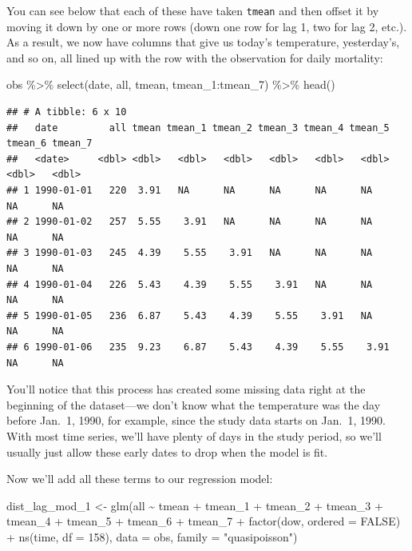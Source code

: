 \documentclass[
]{book}
\newenvironment{Shaded}{\begin{snugshade}}{\end{snugshade}}
\newcommand{\AttributeTok}[1]{\textcolor[rgb]{0.77,0.63,0.00}{#1}}
\newcommand{\ConstantTok}[1]{\textcolor[rgb]{0.00,0.00,0.00}{#1}}
\newcommand{\DecValTok}[1]{\textcolor[rgb]{0.00,0.00,0.81}{#1}}
\newcommand{\FunctionTok}[1]{\textcolor[rgb]{0.00,0.00,0.00}{#1}}
\newcommand{\NormalTok}[1]{#1}
\newcommand{\OtherTok}[1]{\textcolor[rgb]{0.56,0.35,0.01}{#1}}
\newcommand{\SpecialCharTok}[1]{\textcolor[rgb]{0.00,0.00,0.00}{#1}}
\newcommand{\StringTok}[1]{\textcolor[rgb]{0.31,0.60,0.02}{#1}}
\begin{document}
You can see below that each of these have taken \texttt{tmean} and then offset it by moving it down
by one or more rows (down one row for lag 1, two for lag 2, etc.). As a result, we now have
columns that give us today's temperature, yesterday's, and so on, all lined up with the
row with the observation for daily mortality:

\begin{Shaded}
\begin{Highlighting}[]
\NormalTok{obs }\SpecialCharTok{\%\textgreater{}\%} 
  \FunctionTok{select}\NormalTok{(date, all, tmean, tmean\_1}\SpecialCharTok{:}\NormalTok{tmean\_7) }\SpecialCharTok{\%\textgreater{}\%} 
  \FunctionTok{head}\NormalTok{()}
\end{Highlighting}
\end{Shaded}

\begin{verbatim}
## # A tibble: 6 x 10
##   date         all tmean tmean_1 tmean_2 tmean_3 tmean_4 tmean_5 tmean_6 tmean_7
##   <date>     <dbl> <dbl>   <dbl>   <dbl>   <dbl>   <dbl>   <dbl>   <dbl>   <dbl>
## 1 1990-01-01   220  3.91   NA      NA      NA      NA      NA         NA      NA
## 2 1990-01-02   257  5.55    3.91   NA      NA      NA      NA         NA      NA
## 3 1990-01-03   245  4.39    5.55    3.91   NA      NA      NA         NA      NA
## 4 1990-01-04   226  5.43    4.39    5.55    3.91   NA      NA         NA      NA
## 5 1990-01-05   236  6.87    5.43    4.39    5.55    3.91   NA         NA      NA
## 6 1990-01-06   235  9.23    6.87    5.43    4.39    5.55    3.91      NA      NA
\end{verbatim}

You'll notice that this process has created some missing data right at the beginning of the
dataset---we don't know what the temperature was the day before Jan.~1, 1990, for example,
since the study data starts on Jan.~1, 1990. With most time series, we'll have plenty of
days in the study period, so we'll usually just allow these early dates to drop when the
model is fit.

Now we'll add all these terms to our regression model:

\begin{Shaded}
\begin{Highlighting}[]
\NormalTok{dist\_lag\_mod\_1 }\OtherTok{\textless{}{-}} \FunctionTok{glm}\NormalTok{(all }\SpecialCharTok{\textasciitilde{}}\NormalTok{ tmean }\SpecialCharTok{+}\NormalTok{ tmean\_1 }\SpecialCharTok{+}\NormalTok{ tmean\_2 }\SpecialCharTok{+}\NormalTok{ tmean\_3 }\SpecialCharTok{+}\NormalTok{ tmean\_4 }\SpecialCharTok{+} 
\NormalTok{                        tmean\_5 }\SpecialCharTok{+}\NormalTok{ tmean\_6 }\SpecialCharTok{+}\NormalTok{ tmean\_7 }\SpecialCharTok{+} 
                        \FunctionTok{factor}\NormalTok{(dow, }\AttributeTok{ordered =} \ConstantTok{FALSE}\NormalTok{) }\SpecialCharTok{+}
                          \FunctionTok{ns}\NormalTok{(time, }\AttributeTok{df =} \DecValTok{158}\NormalTok{), }
                        \AttributeTok{data =}\NormalTok{ obs, }\AttributeTok{family =} \StringTok{"quasipoisson"}\NormalTok{)}
\end{Highlighting}
\end{Shaded}
\end{document}
